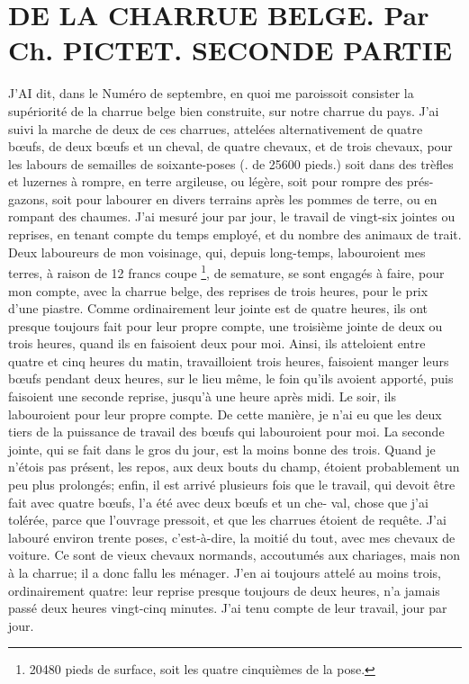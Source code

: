 \setcounter{page}{394} \section{DE LA CHARRUE BELGE. Par Ch. PICTET. SECONDE PARTIE}
J'AI dit, dans le Numéro de septembre, en quoi me paroissoit consister la supériorité de la charrue belge bien construite, sur notre charrue du pays. J'ai suivi la marche de deux de ces charrues, attelées alternativement de quatre bœufs, de deux bœufs et un cheval, de quatre chevaux, et de trois chevaux, pour les labours de semailles de soixante-poses (. de 25600 pieds.) soit dans des trèfles et luzernes à rompre, en terre argileuse, ou légère, soit pour rompre des prés-gazons, soit pour labourer en divers terrains après les pommes de terre, ou en rompant des chaumes. J'ai mesuré jour par jour, le travail de vingt-six jointes ou reprises, en tenant compte du temps employé, et du nombre des animaux de trait. Deux laboureurs de mon voisinage, qui, depuis long-temps, labouroient mes terres, à raison de 12 francs\setcounter{page}{395} coupe \footnote{20480 pieds de surface, soit les quatre cinquièmes de la pose.}, de semature, se sont engagés à faire, pour mon compte, avec la charrue belge, des reprises de trois heures, pour le prix d'une piastre. Comme ordinairement leur jointe est de quatre heures, ils ont presque toujours fait pour leur propre compte, une troisième jointe de deux ou trois heures, quand ils en faisoient deux pour moi. Ainsi, ils atteloient entre quatre et cinq heures du matin, travailloient trois heures, faisoient manger leurs bœufs pendant deux heures, sur le lieu même, le foin qu'ils avoient apporté, puis faisoient une seconde reprise, jusqu'à une heure après midi. Le soir, ils labouroient pour leur propre compte. De cette manière, je n'ai eu que les deux tiers de la puissance de travail des bœufs qui labouroient pour moi. La seconde jointe, qui se fait dans le gros du jour, est la moins bonne des trois. Quand je n'étois pas présent, les repos, aux deux bouts du champ, étoient probablement un peu plus prolongés; enfin, il est arrivé plusieurs fois que le travail, qui devoit être fait avec quatre bœufs, l'a été avec deux bœufs et un che-\setcounter{page}{396} val, chose que j'ai tolérée, parce que l'ouvrage pressoit, et que les charrues étoient de requête.
J'ai labouré environ trente poses, c'est-à-dire, la moitié du tout, avec mes chevaux de voiture. Ce sont de vieux chevaux normands, accoutumés aux chariages, mais non à la charrue; il a donc fallu les ménager. J'en ai toujours attelé au moins trois, ordinairement quatre: leur reprise presque toujours de deux heures, n'a jamais passé deux heures vingt-cinq minutes. J'ai tenu compte de leur travail, jour par jour.
